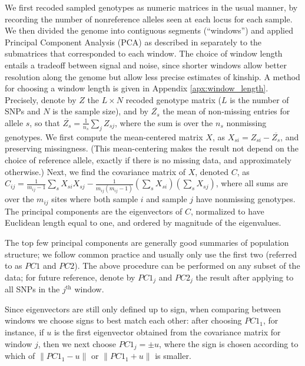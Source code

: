 \documentclass[11pt, oneside]{article}   	%
\newcommand{\pcone}{PC1}
\newcommand{\pctwo}{PC2}
\begin{document}
We first recoded sampled genotypes as numeric matrices in the usual manner,
by recording the number of nonreference alleles seen at each locus for each sample.
We then divided the genome into contiguous segments 
(``windows'')
and applied Principal Component Analysis (PCA) as described in \citet{mcvean2009genealogical}
separately to the submatrices that corresponded to each window.
The choice of window length entails a tradeoff between signal and noise,
since shorter windows allow better resolution along the genome but allow less precise estimates of kinship.
A method for choosing a window length is given in Appendix \ref{apx:window_length}.
Precisely,
denote by $Z$ the $L\times N$ recoded genotype matrix ($L$ is the number of SNPs and $N$ is the sample size), 
and by $\overline{Z_{s}}$ the mean of non-missing entries for allele $s$, 
so that $\overline{Z_{s}}=\frac{1}{n_s}\sum_j Z_{sj}$, 
where the sum is over the $n_s$ nonmissing genotypes.
We first compute the mean-centered matrix $X$, as $X_{si}=Z_{si}-\overline{Z_{s}}$,
and preserving missingness.
(This mean-centering makes the result not depend on the choice of reference allele,
exactly if there is no missing data, and approximately otherwise.)
Next, we find the covariance matrix of $X$, denoted $C$,
as $C_{ij} = \frac{1}{m_{ij}-1} \sum_s X_{si} X_{sj} - \frac{1}{m_{ij}(m_{ij}-1)} (\sum_s X_{si})(\sum_s X_{sj})$,
where all sums are over the $m_{ij}$ sites where both sample $i$ and sample $j$ have nonmissing genotypes.
The principal components are the eigenvectors of $C$, 
normalized to have Euclidean length equal to one,
and ordered by magnitude of the eigenvalues.

The top few principal components are generally good summaries of population structure; 
we follow common practice and usually only use the first two (referred to as $\pcone$ and $\pctwo$).
The above procedure can be performed on any subset of the data;
for future reference, denote by $\pcone_j$ and $\pctwo_j$
the result after applying to all SNPs in the $j^\text{th}$ window.

Since eigenvectors are still only defined up to sign,
when comparing between windows we choose signs to best match each other:
after choosing $\pcone_1$, for instance, 
if $u$ is the first eigenvector obtained from the covariance matrix
for window $j$,
then we next choose $\pcone_j = \pm u$,
where the sign is chosen according to which of 
$\| \pcone_{1} - u \|$ or
$\| \pcone_{1} + u \|$ 
is smaller.
\end{document}
